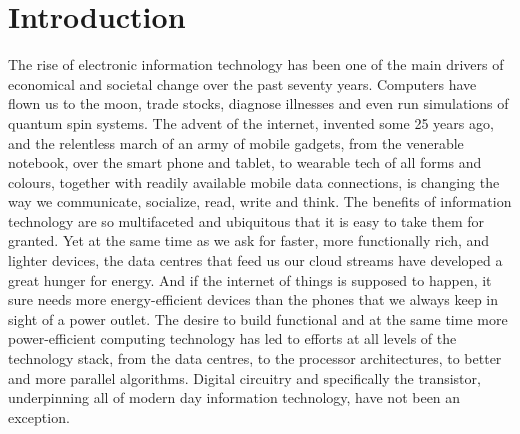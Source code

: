 \chapter{Introduction}

The rise of electronic information technology has been one of the main drivers
of economical and societal change over the past seventy years. Computers have
flown us to the moon, trade stocks, diagnose illnesses and even run simulations
of quantum spin systems. The advent of the internet, invented some 25 years ago,
and the relentless march of an army of mobile gadgets, from the venerable
notebook, over the smart phone and tablet, to wearable tech of all forms and
colours, together with readily available mobile data connections, is changing
the way we communicate, socialize, read, write and think. The benefits of
information technology are so multifaceted and ubiquitous that it is easy to
take them for granted. Yet at the same time as we ask for faster, more
functionally rich, and lighter devices, the data centres that feed us our cloud
streams have developed a great hunger for energy. And if the internet of things
is supposed to happen, it sure needs more energy-efficient devices than the
phones that we always keep in sight of a power outlet. The desire to build
functional and at the same time more power-efficient computing technology has
led to efforts at all levels of the technology stack, from the data centres, to
the processor architectures, to better and more parallel algorithms. Digital
circuitry and specifically the transistor, underpinning all of modern day
information technology, have not been an exception.


